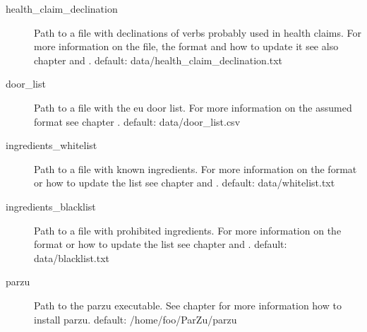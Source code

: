 \documentclass[letterpaper,10pt,english]{sphinxmanual}
\begin{document}
\begin{description}
\item[{health\_claim\_declination}] \leavevmode
Path to a file with declinations of verbs probably used in health
claims. For more information on the file, the format and how to
update it see also chapter {\hyperref[\detokenize{external_data:external-hc-declination}]{}} and
{\hyperref[\detokenize{online_learning:declination-online}]{}}. default:
data/health\_claim\_declination.txt

\item[{door\_list}] \leavevmode
Path to a file with the eu door list. For more information on the
assumed format see chapter {\hyperref[\detokenize{external_data:external-door}]{}}. default:
data/door\_list.csv

\item[{ingredients\_whitelist}] \leavevmode
Path to a file with known ingredients. For more information on the
format or how to update the list see chapter
{\hyperref[\detokenize{external_data:external-black-white}]{}} and {\hyperref[\detokenize{online_learning:black-white-online}]{}}. default:
data/whitelist.txt

\item[{ingredients\_blacklist}] \leavevmode
Path to a file with prohibited ingredients. For more information on
the format or how to update the list see chapter
{\hyperref[\detokenize{external_data:external-black-white}]{}} and {\hyperref[\detokenize{online_learning:black-white-online}]{}}. default:
data/blacklist.txt

\item[{parzu}] \leavevmode
Path to the parzu executable. See chapter {\hyperref[\detokenize{installation:installation}]{}} for more
information how to install parzu. default: /home/foo/ParZu/parzu

\end{description}
\end{document}
